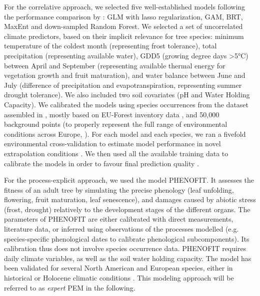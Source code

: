 \documentclass[letterpaper,8pt]{article}  %
\begin{document}
\begin{doublespacing}
\begin{linenumbers}
For the correlative approach, we selected five well-established models following the performance comparison by \cite{Valavi2022}: GLM with lasso regularization, GAM, BRT, MaxEnt and down-sampled Random Forest. We selected a set of uncorrelated climate predictors, based on their implicit relevance for tree species: minimum temperature of the coldest month (representing frost tolerance), total precipitation (representing available water), GDD5 (growing degree days \textgreater5°C) between April and September (representing available thermal energy for vegetation growth and fruit maturation), and water balance between June and July (difference of precipitation and evapotranspiration, representing summer drought tolerance). We also included two soil covariates (pH and Water Holding Capacity). We calibrated the models using species occurrences from the dataset assembled in \cite{VanderMeersch2023}, mostly based on EU-Forest inventory data \citep{Mauri2017}, and 50,000 background points (to properly represent the full range of environmental conditions across Europe, \citealp{Valavi2022}). For each model and each species, we ran a fivefold environmental cross-validation to estimate model performance in novel extrapolation conditions \citep{Roberts2017}. We then used all the available training data to calibrate the models in order to favour final prediction quality \citep{Roberts2017}.

For the process-explicit approach, we used the model PHENOFIT. It assesses the fitness of an adult tree by simulating the precise phenology (leaf unfolding, flowering, fruit maturation, leaf senescence), and damages caused by abiotic stress (frost, drought) relatively to the development stages of the different organs. The parameters of PHENOFIT are either calibrated with direct measurements, literature data, or inferred  using observations of the processes modelled (e.g. species-specific phenological dates to calibrate phenological subcomponents). Its calibration thus does not involve species occurrence data. PHENOFIT requires daily climate variables, as well as the soil water holding capacity. The model has been validated for several North American and European species, either in historical or Holocene climatic conditions \citep{Morin2007, Saltre2013, Duputie2015, Gauzere2020, VanderMeersch2024}. This modeling approach will be referred to as \emph{expert} PEM in the following.


\end{linenumbers}
\end{doublespacing}
\end{document}
